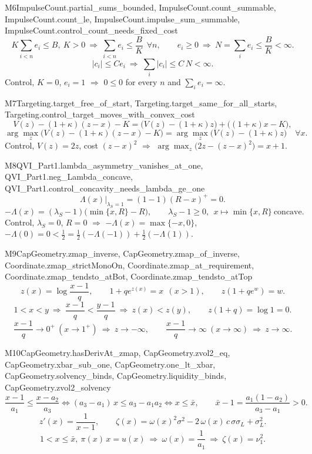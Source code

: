 \begin{mproof}{M6}{ImpulseCount.partial_sums_bounded, ImpulseCount.count_summable, ImpulseCount.count_le, ImpulseCount.impulse_sum_summable, ImpulseCount.control_count_needs_fixed_cost}
\[ K\sum_{i<n}e_i\le B,\ K>0\ \Rightarrow\ \sum_{i<n}e_i\le\frac BK\ \ \forall n,\qquad e_i\ge0\ \Rightarrow\ N=\sum_ie_i\le\frac BK<\infty . \]
\[ |c_i|\le Ce_i\ \Rightarrow\ \sum_i|c_i|\le C\,N<\infty . \]
Control, $K=0$, $e_i=1$ $\Rightarrow$ $0\le0$ for every $n$ and $\sum_ie_i=\infty$.
\end{mproof}

\begin{mproof}{M7}{Targeting.target_free_of_start, Targeting.target_same_for_all_starts, Targeting.control_target_moves_with_convex_cost}
\[ V(z)-(1+\kappa)(z-x)-K=\big(V(z)-(1+\kappa)z\big)+\big((1+\kappa)x-K\big), \]
\[ \arg\max_z\big(V(z)-(1+\kappa)(z-x)-K\big)=\arg\max_z\big(V(z)-(1+\kappa)z\big)\quad\forall x . \]
Control, $V(z)=2z$, cost $(z-x)^2$ $\Rightarrow$ $\arg\max_z\big(2z-(z-x)^2\big)=x+1$.
\end{mproof}

\begin{mproof}{M8}{QVI_Part1.lambda_asymmetry_vanishes_at_one, QVI_Part1.neg_Lambda_concave, QVI_Part1.control_concavity_needs_lambda_ge_one}
\[ \Lambda(x)\big|_{\lambda_S=1}=(1-1)(R-x)^+=0 . \]
\[ -\Lambda(x)=(\lambda_S-1)\big(\min\{x,R\}-R\big),\qquad \lambda_S-1\ge0,\ \ x\mapsto\min\{x,R\}\ \text{concave} . \]
Control, $\lambda_S=0$, $R=0$ $\Rightarrow$ $-\Lambda(x)=\max\{-x,0\}$, $-\Lambda(0)=0<\tfrac12=\tfrac12(-\Lambda(-1))+\tfrac12(-\Lambda(1))$.
\end{mproof}

\begin{mproof}{M9}{CapGeometry.zmap_inverse, CapGeometry.zmap_of_inverse, Coordinate.zmap_strictMonoOn, Coordinate.zmap_at_requirement, Coordinate.zmap_tendsto_atBot, Coordinate.zmap_tendsto_atTop}
\[ z(x)=\log\frac{x-1}{q},\qquad 1+qe^{z(x)}=x\ \ (x>1),\qquad z(1+qe^{w})=w . \]
\[ 1<x<y\ \Rightarrow\ \frac{x-1}{q}<\frac{y-1}{q}\ \Rightarrow\ z(x)<z(y),\qquad z(1+q)=\log1=0 . \]
\[ \frac{x-1}{q}\to0^+\ (x\to1^+)\ \Rightarrow\ z\to-\infty,\qquad \frac{x-1}{q}\to\infty\ (x\to\infty)\ \Rightarrow\ z\to\infty . \]
\end{mproof}

\begin{mproof}{M10}{CapGeometry.hasDerivAt_zmap, CapGeometry.zvol2_eq, CapGeometry.xbar_sub_one, CapGeometry.one_lt_xbar, CapGeometry.solvency_binds, CapGeometry.liquidity_binds, CapGeometry.zvol2_solvency}
\[ \frac{x-1}{a_1}\le\frac{x-a_2}{a_3}\iff(a_3-a_1)\,x\le a_3-a_1a_2\iff x\le\bar x,\qquad \bar x-1=\frac{a_1(1-a_2)}{a_3-a_1}>0 . \]
\[ z'(x)=\frac{1}{x-1},\qquad \zeta(x)=\omega(x)^2\sigma^2-2\,\omega(x)\,c\,\sigma\sigma_L+\sigma_L^2 . \]
\[ 1<x\le\bar x,\ \pi(x)\,x=u(x)\ \Rightarrow\ \omega(x)=\frac{1}{a_1}\ \Rightarrow\ \zeta(x)=\nu_1^2. \]
\end{mproof}

